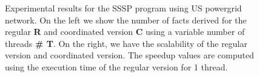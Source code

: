 \begin{figure}[h!]
   \begin{center}
   \end{center}
   \caption{Experimental results for the SSSP program using US powergrid network.
   On the left we show the number of facts derived for the regular \textbf{R}
   and coordinated version \textbf{C} using a variable number of threads
   \textbf{\# T}. On the right, we have the scalability of the regular version
   and coordinated version. The speedup values are computed using the execution
   time of the regular version for 1 thread.}
   \label{results:sssp_uspowergrid}
\end{figure}
